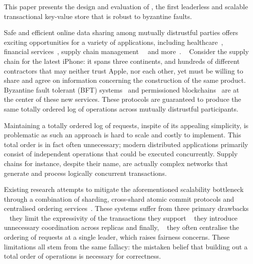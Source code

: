 This paper presents the design and evaluation of \sys{}, the
first leaderless and scalable transactional key-value store that is robust to byzantine faults.

Safe and efficient online data sharing among mutually distrustful
parties offers exciting opportunities for a variety of applications,
including healthcare~\cite{}, financial services~\cite{}, supply chain
management~~\cite{} and more~\cite{}. ~ Consider the supply chain for the latest iPhone: it spans three continents, and hundreds of different contractors \cite{AppleSup} that may neither trust Apple, nor each other, yet must be willing to share and agree on information concerning the construction of the same product.
Byzantine fault tolerant (BFT)
systems~\cite{castro1999practical,martin2006fast,kotla2007zyzzyva,  gueta2018sbft,clement2009making,buchman2016tendermint,yin2019hotstuff,Clement09Upright,duan2014hbft, pires2018generalized,bessani2014state,lamport2011byzantizing,arun2019ezbft, malkhi2019flexible,duan2014hbft,yin2003separating, Guerraoui08Next, Kotla04High,liskov2010viewstamped} and permissioned blockchains~\cite{Hyperledger,EthereumQuorum, buchman2016tendermint, al2017chainspace,kokoris2018omniledger,gilad2017algorand, baudet2019state} are at the center of these new services. These protocols are guaranteed to
produce the same totally ordered log of operations across mutually distrustful
participants. 

Maintaining a totally ordered log of requests, inspite of its appealing simplicity, is problematic as such an approach is hard to scale and costly to implement. This total order is in fact often unnecessary; modern distributed applications primarily consist of independent operations that could be executed concurrently. Supply chains for instance, despite their name, are actually complex networks that generate and process logically concurrent transactions.

Existing research attempts to mitigate the aforementioned scalability bottleneck through a combination of sharding, cross-shard atomic commit protocols and centralised ordering services~\cite{kokoris2018omniledger,al2017chainspace,padilha2016callinicos}. These systems suffer from three primary drawbacks \one ~ they limit the expressivity of the transactions they support \two ~ they introduce unnecessary coordination across replicas and finally,
\three ~ they often centralise the ordering of requests at a single leader, which raises fairness  concerns. These limitations all stem from the same fallacy: the mistaken belief that building out a total order of operations is necessary for correctness.
 
